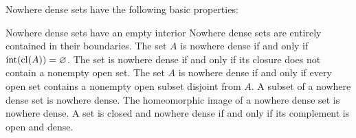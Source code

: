 \begin{proposition}\label{thm:nowhere_dense_properties}
  Nowhere dense sets have the following basic properties:
  \begin{propenum}
     Nowhere dense sets have an empty interior
     Nowhere dense sets are entirely contained in their boundaries.
     The set \( A \) is nowhere dense if and only if \( \operatorname{int}(\operatorname{cl}(A)) = \varnothing \).
     The set is nowhere dense if and only if its closure does not contain a nonempty open set.
    \cite[proposition 1.3.5]{Engelking1989} The set \( A \) is nowhere dense if and only if every open set contains a nonempty open subset disjoint from \( A \).
     A subset of a nowhere dense set is nowhere dense.
     The homeomorphic image of a nowhere dense set is nowhere dense.
     A set is closed and nowhere dense if and only if its complement is open and dense.
  \end{propenum}
\end{proposition}
